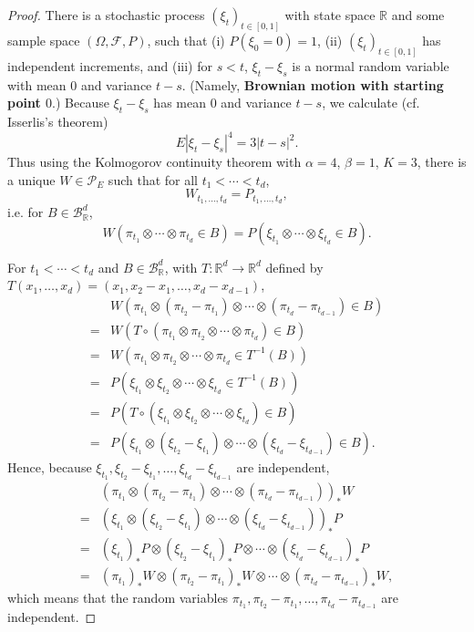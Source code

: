 \documentclass{article}
\theoremstyle{definition}
\begin{document}
\begin{proof}
There is a stochastic process $(\xi_t)_{t \in [0,1]}$ with state space $\mathbb{R}$ and some sample space $(\Omega,\mathscr{F},P)$, 
such that (i) $P(\xi_0=0)=1$, (ii)  $(\xi_t)_{t \in [0,1]}$ has independent increments, and (iii) for $s < t$, $\xi_t-\xi_s$ is a normal
random variable with mean $0$ and variance $t-s$.
(Namely,
\textbf{Brownian motion with starting point $0$}.)
Because $\xi_t-\xi_s$ has mean $0$ and variance $t-s$, we calculate (cf. Isserlis's theorem)
\[
E|\xi_t-\xi_s|^4 = 3|t-s|^2.
\]
Thus using the Kolmogorov continuity theorem with $\alpha=4$, $\beta=1$, $K=3$, 
there is a unique $W \in \mathscr{P}_E$ such that for all $t_1<\cdots<t_d$,
\[
W_{t_1,\ldots,t_d} = P_{t_1,\ldots,t_d},
\]
i.e. for $B \in \mathscr{B}_{\mathbb{R}}^d$,
\[
W(\pi_{t_1} \otimes \cdots \otimes \pi_{t_d} \in B)
= P(\xi_{t_1} \otimes  \cdots \otimes \xi_{t_d} \in B).
\]

For $t_1<\cdots<t_d$ and $B \in \mathscr{B}_{\mathbb{R}}^d$, with $T:\mathbb{R}^d \to \mathbb{R}^d$
defined by $T(x_1,\ldots,x_d) = (x_1,x_2-x_1,\ldots,x_d-x_{d-1})$,
\[
\begin{split}
&W( \pi_{t_1} \otimes (\pi_{t_2}-\pi_{t_1}) \otimes \cdots \otimes (\pi_{t_d}-\pi_{t_{d-1}}) \in B)\\
=&W(T \circ (\pi_{t_1} \otimes \pi_{t_2} \otimes \cdots \otimes \pi_{t_d}) \in B)\\
=&W(\pi_{t_1} \otimes \pi_{t_2} \otimes \cdots \otimes \pi_{t_d} \in T^{-1}(B))\\
=&P(\xi_{t_1} \otimes \xi_{t_2} \otimes \cdots \otimes \xi_{t_d} \in T^{-1}(B))\\
=&P(T \circ (\xi_{t_1} \otimes \xi_{t_2} \otimes \cdots \otimes \xi_{t_d}) \in B)\\
=&P(\xi_{t_1} \otimes (\xi_{t_2}-\xi_{t_1}) \otimes \cdots \otimes (\xi_{t_d}-\xi_{t_{d-1}}) \in B).
\end{split}
\]
Hence, because $\xi_{t_1},\xi_{t_2}-\xi_{t_1},\ldots,\xi_{t_d}-\xi_{t_{d-1}}$ are independent,
\[
\begin{split}
&(\pi_{t_1} \otimes (\pi_{t_2}-\pi_{t_1}) \otimes \cdots \otimes (\pi_{t_d}-\pi_{t_{d-1}}))_* W\\
=&(\xi_{t_1} \otimes (\xi_{t_2}-\xi_{t_1}) \otimes \cdots \otimes (\xi_{t_d}-\xi_{t_{d-1}}))_*P\\
=&(\xi_{t_1})_*P \otimes (\xi_{t_2}-\xi_{t_1})_*P \otimes \cdots \otimes (\xi_{t_d}-\xi_{t_{d-1}})_*P\\
=&(\pi_{t_1})_*W \otimes (\pi_{t_2}-\pi_{t_1})_*W \otimes \cdots \otimes (\pi_{t_d}-\pi_{t_{d-1}})_*W,
\end{split}
\]
which means that the random variables $\pi_{t_1},\pi_{t_2}-\pi_{t_1},\ldots,\pi_{t_d}-\pi_{t_{d-1}}$ are independent. 


\end{proof}
\end{document}

